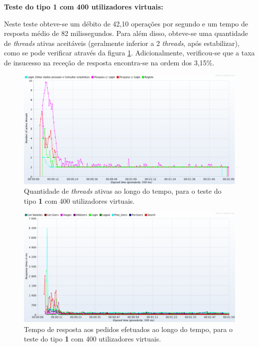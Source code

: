 \vspace{0.5cm}
\noindent\textbf{Teste do tipo 1 com 400 utilizadores virtuais:}

Neste teste obteve-se um débito de 42,10 operações por segundo e um tempo de resposta médio de 82 milissegundos. Para além disso, obteve-se uma quantidade de \textit{threads} ativas aceitáveis (geralmente inferior a 2 \textit{threads}, após estabilizar), como se pode verificar através da figura \ref{fig:3PC_400_threads}. Adicionalmente, verificou-se que a taxa de insucesso na receção de resposta encontra-se na ordem dos 3,15\%. 


\begin{figure}[H]
    \centering
    \includegraphics[width=1\textwidth]{images/Testes/3PC_400T.png}
    \caption{Quantidade de \textit{threads} ativas ao longo do tempo, para o teste do tipo \textbf{1} com 400 utilizadores virtuais.}
    \label{fig:3PC_400_threads}
\end{figure}

\begin{figure}[H]
    \centering
    \includegraphics[width=1\textwidth]{images/Testes/3PC_400R.png}
    \caption{Tempo de resposta aos pedidos efetuados ao longo do tempo, para o teste do tipo \textbf{1} com 400 utilizadores virtuais.}
    \label{fig:3PC_400_response}
\end{figure}

